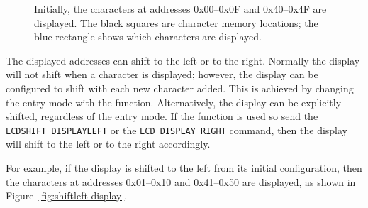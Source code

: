 \begin{figure}[t]
    \caption{Initially, the characters at addresses 0x00--0x0F and 0x40--0x4F are displayed. The black squares are character memory locations; the blue rectangle shows which characters are displayed.} \label{fig:initial-display}
\end{figure}

The displayed addresses can shift to the left or to the right.
Normally the display will not shift when a character is displayed; however, the display can be configured to shift with each new character added.
This is achieved by changing the entry mode with the \hyperlink{function:cowpi_lcd1602_send_command}{} function.
Alternatively, the display can be explicitly shifted, regardless of the entry mode. If the \hyperlink{function:cowpi_lcd1602_send_command}{} function is used so send the \lstinline{LCDSHIFT_DISPLAYLEFT} or the \lstinline{LCD_DISPLAY_RIGHT} command, then the display will shift to the left or to the right accordingly.

For example, if the display is shifted to the left from its initial configuration, then the characters at addresses 0x01--0x10 and 0x41--0x50 are displayed, as shown in Figure~\ref{fig:shiftleft-display}.


